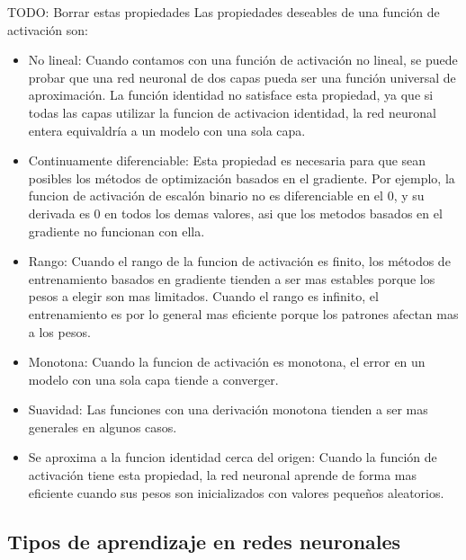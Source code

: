 TODO: Borrar estas propiedades
Las propiedades deseables de una función de activación son:
\begin{itemize}
\item No lineal: Cuando contamos con una función de activación no lineal, se puede probar que una red neuronal de dos capas pueda ser una función universal de aproximación. La función identidad no satisface esta propiedad, ya que si todas las capas utilizar la funcion de activacion identidad, la red neuronal entera equivaldría a un modelo con una sola capa.
\item Continuamente diferenciable: Esta propiedad es necesaria para que sean posibles los métodos de optimización basados en el gradiente. Por ejemplo, la funcion de activación de escalón binario no es diferenciable en el 0, y su derivada es 0 en todos los demas valores, asi que los metodos basados en el gradiente no funcionan con ella.
\item Rango: Cuando el rango de la funcion de activación es finito, los métodos de entrenamiento basados en gradiente tienden a ser mas estables porque los pesos a elegir son mas limitados. Cuando el rango es infinito, el entrenamiento es por lo general mas eficiente porque los patrones afectan mas a los pesos.
\item Monotona: Cuando la funcion de activación es monotona, el error en un modelo con una sola capa tiende a converger.
\item Suavidad: Las funciones con una derivación monotona tienden a ser mas generales en algunos casos.
\item Se aproxima a la funcion identidad cerca del origen: Cuando la función de activación tiene esta propiedad, la red neuronal aprende de forma mas eficiente cuando sus pesos son inicializados con valores pequeños aleatorios.
\end{itemize}

\subsection{Tipos de aprendizaje en redes neuronales}
